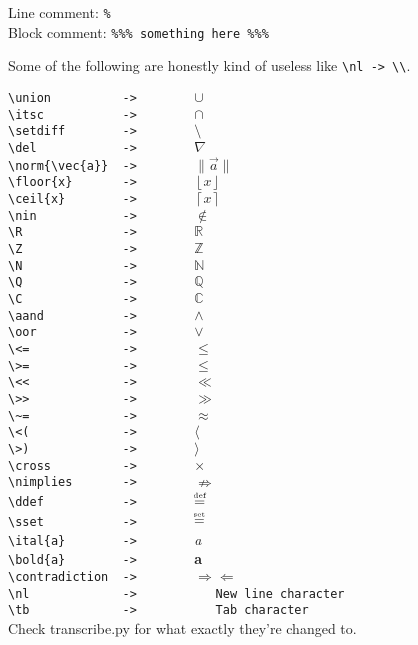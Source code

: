 \documentclass[12pt]{article}
\newcommand{\norm}[1]{\|#1\|}
\newcommand{\ddef}{\mathrel{\stackrel{\makebox[0pt]{\mbox{\normalfont\tiny def}}}{=}}}
\newcommand{\sset}{\mathrel{\stackrel{\makebox[0pt]{\mbox{\normalfont\tiny set}}}{=}}}
\newcommand{\floor}[1]{\left\lfloor #1 \right\rfloor}
\newcommand{\ceil}[1]{\left\lceil #1 \right\rceil}
\begin{document}
\begin{flushleft}
Line comment: \verb|%|\\
Block comment: \verb|%|\verb|%|\verb|%|\verb| something here |\verb|%|\verb|%|\verb|%|

\medskip

Some of the following are honestly kind of useless like \verb|\nl -> \\|.

\verb|\union          ->        |$\cup$\\
\verb|\itsc           ->        |$\cap$\\
\verb|\setdiff        ->        |$\setminus$\\
\verb|\del            ->        |$\nabla$\\
\verb|\norm{\vec{a}}  ->        |$\norm{\vec{a}}$\\
\verb|\floor{x}       ->        |$\floor{x}$\\
\verb|\ceil{x}        ->        |$\ceil{x}$\\
\verb|\nin            ->        |$\notin$\\
\verb|\R              ->        |$\mathbb{R}$\\
\verb|\Z              ->        |$\mathbb{Z}$\\
\verb|\N              ->        |$\mathbb{N}$\\
\verb|\Q              ->        |$\mathbb{Q}$\\
\verb|\C              ->        |$\mathbb{C}$\\
\verb|\aand           ->        |$\wedge$\\
\verb|\oor            ->        |$\vee$\\
\verb|\<=             ->        |$\leq$\\
\verb|\>=             ->        |$\leq$\\
\verb|\<<             ->        |$\ll$\\
\verb|\>>             ->        |$\gg$\\
\verb|\~=             ->        |$\approx$\\
\verb|\<(             ->        |$\langle$\\
\verb|\>)             ->        |$\rangle$\\
\verb|\cross          ->        |$\times$\\
\verb|\nimplies       ->        |$\nRightarrow$\\
\verb|\ddef           ->        |$\ddef$\\
\verb|\sset           ->        |$\sset$\\
\bigskip
\verb|\ital{a}        ->        |\emph{a}\\
\verb|\bold{a}        ->        |\textbf{a}\\
\verb|\contradiction  ->        |$\Rightarrow\Leftarrow$ \\
\verb|\nl             ->           New line character|\\
\verb|\tb             ->           Tab character|\\
\bigskip
Check transcribe.py for what exactly they're changed to.


\end{flushleft}
\end{document}

